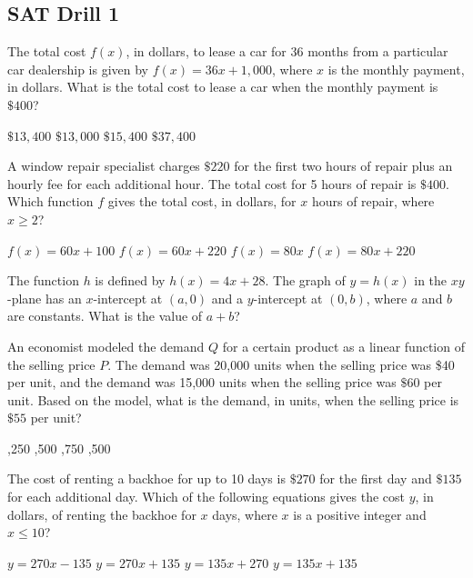 
\subsection*{SAT Drill 1} 

\question[1]
The total cost $f(x)$, in dollars, to lease a car for 36 months from a particular car dealership is given by $f(x) = 36x + 1,000$, where $x$ is the monthly payment, in dollars. What is the total cost to lease a car when the monthly payment is $\$400$?
\begin{choices}
  \choice $\$13,400$
  \choice $\$13,000$
  \CorrectChoice $\$15,400$
  \choice $\$37,400$
\end{choices}


\question[1]
A window repair specialist charges $\$220$ for the first two hours of repair plus an hourly fee for each additional hour. The total cost for 5 hours of repair is $\$400$. Which function $f$ gives the total cost, in dollars, for $x$ hours of repair, where $x \geq 2$?
\begin{choices}
  \CorrectChoice $f(x) = 60x + 100$
  \choice $f(x) = 60x + 220$
  \choice $f(x) = 80x$
  \choice $f(x) = 80x + 220$
\end{choices} 

\question[1]
The function $h$ is defined by $h(x) = 4x + 28$. The graph of $y = h(x)$ in the $xy$-plane has an $x$-intercept at $(a, 0)$ and a $y$-intercept at $(0, b)$, where $a$ and $b$ are constants. What is the value of $a + b$?
\begin{choices}
\end{choices}

\newpage

\question[1]
An economist modeled the demand $Q$ for a certain product as a linear function of the selling price $P$. The demand was 20,000 units when the selling price was \$40 per unit, and the demand was 15,000 units when the selling price was $\$ 60$ per unit. Based on the model, what is the demand, in units, when the selling price is $\$ 55$ per unit?
\begin{choices}
  ,250
  ,500
  ,750
  ,500
\end{choices}

\question[1]
The cost of renting a backhoe for up to 10 days is $\$ 270$ for the first day and $\$ 135$ for each additional day. Which of the following equations gives the cost $y$, in dollars, of renting the backhoe for $x$ days, where $x$ is a positive integer and $x \leq 10$?
\begin{choices}
  \choice $y = 270x - 135$
  \choice $y = 270x + 135$
  \choice $y = 135x + 270$
  \CorrectChoice $y = 135x + 135$
\end{choices}

